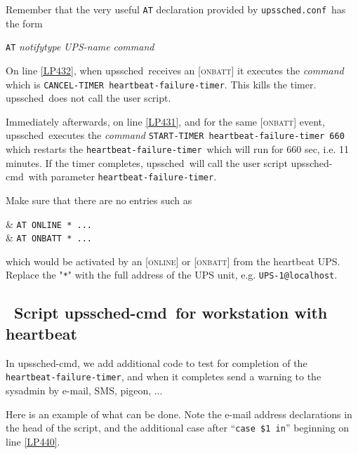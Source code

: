\documentclass[12pt]{article}
\newlength{\headersep}\setlength{\headersep}{3mm}
\newcommand{\Hsep}{\hspace{\headersep}}
\newcommand{\upssched}{\mbox{\textcolor{SCHEDCOLOUR}{upssched}}}
\newcommand{\upsschedcmd}{\mbox{\textcolor{CMDCOLOUR}{upssched-cmd}}}
\newcommand{\ONLINE}{\textcolor{MONCOLOUR}{\textsc{online}}}
\newcommand{\ONBATT}{\textcolor{MONCOLOUR}{\textsc{onbatt}}}
\newcommand{\NOTev}[1]{\textcolor{MONCOLOUR}{[{#1}]}}
\newcommand{\upsschedconf}{\textcolor{SCHEDCOLOUR}{\texttt{upssched.conf}}}
\newcommand{\heartfailtimer}{\texttt{heartbeat{\allowbreak}-failure{\allowbreak}-timer}}
\begin{document}
Remember that the very useful \texttt{AT} declaration provided by
\upsschedconf\ has the form

\begin{center}
\texttt{AT} \textsl{notifytype} \textsl{UPS-name} \textsl{command}
\end{center}

On line \ref{LP432}, when \upssched\ receives an \NOTev{\ONBATT} it executes
the \textsl{command} which is \texttt{CANCEL{\allowbreak}-TIMER
  \heartfailtimer}.  This kills the timer.  \upssched\ does not call the user
script.

Immediately afterwards, on line \ref{LP431}, and for the same \NOTev{\ONBATT}
event, \upssched\ executes the \textsl{command}
\texttt{START{\allowbreak}-TIMER \heartfailtimer\ 660} which restarts the
\heartfailtimer\ which will run for 660 sec, i.e. 11 minutes.  If the timer
completes, \upssched\ will call the user script \upsschedcmd\ with parameter
\heartfailtimer.

Make sure that there are no entries such as

\begin{LinePrinter}[0.95\LinePrinterwidth]
\Clunk          & \verb`AT ONLINE * ...` \\
\Clunk          & \verb`AT ONBATT * ...` \\
\end{LinePrinter}

\noindent which would be activated by an \NOTev{\ONLINE} or \NOTev{\ONBATT}
from the heartbeat UPS.  Replace the "\texttt{*}" with the full address of the
UPS unit, e.g. \verb`UPS-1@localhost`.

\subsection{\Hsep\ Script \upsschedcmd\ for workstation with heartbeat}\label{section:upsschedcmd.heartbeat}

In \upsschedcmd, we add additional code to test for completion of the
\heartfailtimer, and when it completes send a warning to the sysadmin by
e-mail, SMS, pigeon, ...

Here is an example of what can be done.  Note the e-mail address declarations
in the head of the script, and the additional case after ``\verb`case $1 in`''
beginning on line \ref{LP440}.
\end{document}
